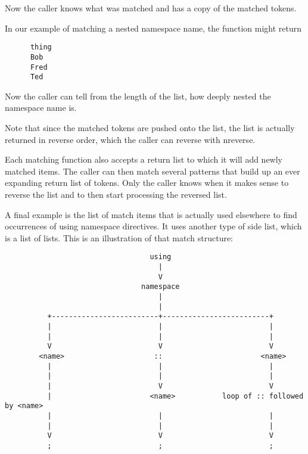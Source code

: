 Now the caller knows what was matched and has a copy of the matched tokens.

In our example of matching a nested namespace name, the function might return

\small{\begin{verbatim}
      thing
      Bob
      Fred
      Ted
\end{verbatim}}

Now the caller can tell from the length of the list, how deeply nested the
namespace name is.

Note that since the matched tokens are pushed onto the list, the list is
actually returned in reverse order, which the caller can reverse with
nreverse.

Each matching function also accepts a return list to which it will add newly
matched items.  The caller can then match several patterns that build up an
ever expanding return list of tokens.  Only the caller knows when it makes
sense to reverse the list and to then start processing the reversed list.

A final example is the list of match items that is actually used elsewhere to
find occurrences of using namespace directives.  It uses another type of side
list, which is a list of lists.  This is an illustration of that match
structure:



\small{\begin{verbatim}
                                  using
                                    |
                                    V
                                namespace
                                    |
                                    |
          +-------------------------+-------------------------+
          |                         |                         |
          |                         |                         |
          V                         V                         V
        <name>                     ::                       <name>
          |                         |                         |
          |                         |                         |
          |                         V                         V
          |                       <name>           loop of :: followed by <name>
          |                         |                         |
          |                         |                         |
          V                         V                         V
          ;                         ;                         ;
\end{verbatim}}

